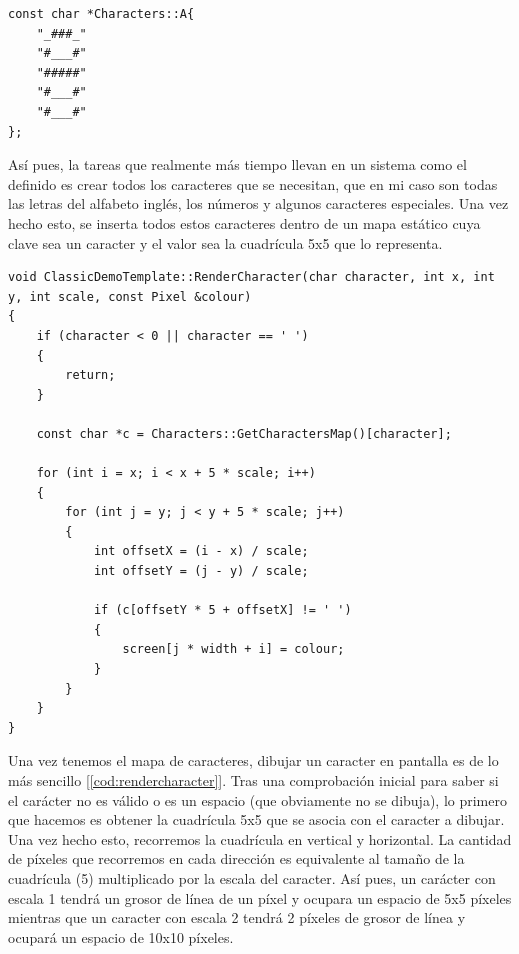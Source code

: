 \begin{lstlisting}[style=C-color, caption={Método que renderiza un sólo caracter},label=cod:fontA]
const char *Characters::A{
    "_###_"
    "#___#"
    "#####"
    "#___#"
    "#___#"
};
\end{lstlisting}

Así pues, la tareas que realmente más tiempo llevan en un sistema como el definido es crear todos los caracteres que se necesitan, que en mi caso son todas las letras del alfabeto inglés, los números y algunos caracteres especiales. Una vez hecho esto, se inserta todos estos caracteres dentro de un mapa estático cuya clave sea un caracter y el valor sea la cuadrícula 5x5 que lo representa.\\

\begin{lstlisting}[style=C-color, caption={Método que renderiza un sólo caracter},label=cod:rendercharacter]
void ClassicDemoTemplate::RenderCharacter(char character, int x, int y, int scale, const Pixel &colour)
{
    if (character < 0 || character == ' ')
    {
        return;
    }

    const char *c = Characters::GetCharactersMap()[character];

    for (int i = x; i < x + 5 * scale; i++)
    {
        for (int j = y; j < y + 5 * scale; j++)
        {
            int offsetX = (i - x) / scale;
            int offsetY = (j - y) / scale;

            if (c[offsetY * 5 + offsetX] != ' ')
            {
                screen[j * width + i] = colour;
            }
        }
    }
}
\end{lstlisting}

Una vez tenemos el mapa de caracteres, dibujar un caracter en pantalla es de lo más sencillo [\ref{cod:rendercharacter}]. Tras una comprobación inicial para saber si el carácter no es válido o es un espacio (que obviamente no se dibuja), lo primero que hacemos es obtener la cuadrícula 5x5 que se asocia con el caracter a dibujar.\\

Una vez hecho esto, recorremos la cuadrícula en vertical y horizontal. La cantidad de píxeles que recorremos en cada dirección es equivalente al tamaño de la cuadrícula (5) multiplicado por la escala del caracter. Así pues, un carácter con escala 1 tendrá un grosor de línea de un píxel y ocupara un espacio de 5x5 píxeles mientras que un caracter con escala 2 tendrá 2 píxeles de grosor de línea y ocupará un espacio de 10x10 píxeles.\\

